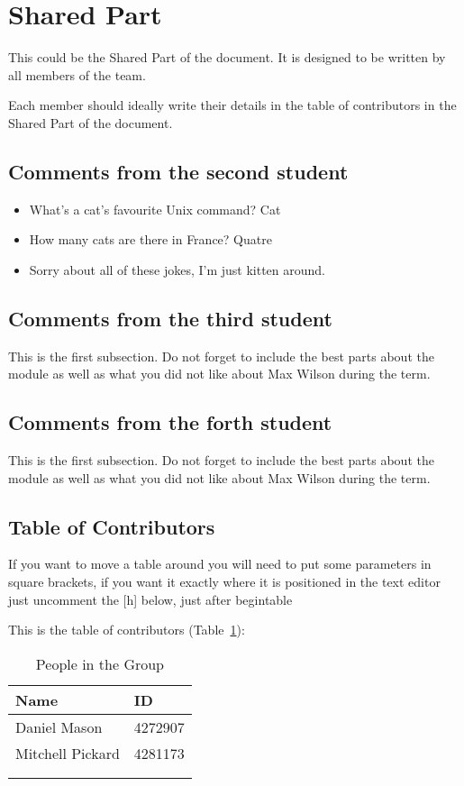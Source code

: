 \section{Shared Part}

This could be the Shared Part of the document. It is designed to be written by all members of the team.

Each member should ideally write their details in the table of contributors in the Shared Part of the document.


\subsection{Comments from the second student}

\begin{itemize}
	\item What's a cat's favourite Unix command? Cat

	\item How many cats are there in France? Quatre

	\item Sorry about all of these jokes, I'm just kitten around.
\end{itemize}

\subsection{Comments from the third student}
This is the first subsection. Do not forget to include the best parts about the module as well as what you did not like about Max Wilson during the term.

\subsection{Comments from the forth student}
This is the first subsection. Do not forget to include the best parts about the module as well as what you did not like about Max Wilson during the term.

\subsection{Table of Contributors}


If you want to move a table around you will need to put some parameters in square brackets, if you want it exactly where it is positioned in the text editor just uncomment the [h] below, just after begin{table}

This is the table of contributors (Table~\ref{authors}):
\begin{table}%
\centering
\caption{People in the Group}
\label{authors}
\begin{tabular}{|l|l|}
\hline
\textbf{Name} & \textbf{ID} \\
\hline
Daniel Mason & 4272907\\
\hline
Mitchell Pickard & 4281173\\
\hline
& \\
\hline
& \\
\hline
\end{tabular}
\end{table}